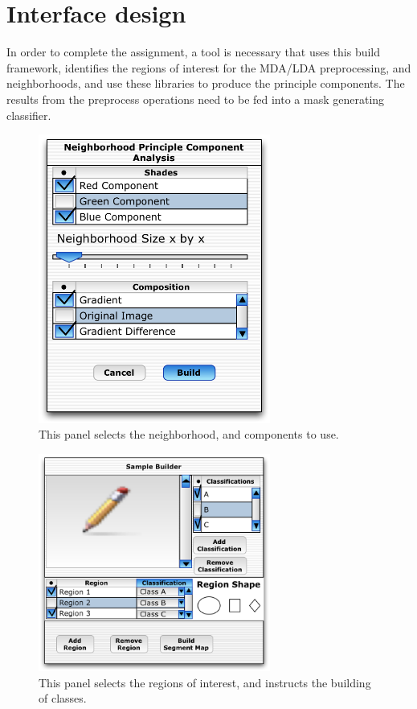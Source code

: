 \documentclass[11pt, twocolumn]{article}
\begin{document}
\section{Interface design}
In order to complete the assignment, a tool is necessary that uses this build framework, identifies the regions of interest for the MDA/LDA preprocessing,  and neighborhoods, and use these libraries to produce the principle components.    The results from the preprocess operations need to be fed into a mask generating classifier.  

\begin{figure}[htbp] %
   \centering
   \includegraphics[width=3in]{neighborhoodPCA.png} 
   \caption{This panel selects the neighborhood, and components to use.}
   \label{neighborhoodPCA}
\end{figure}


\begin{figure}[htbp] %
   \centering
   \includegraphics[width=3in]{regionOfInterestPanel.png} 
   \caption{This panel selects the regions of interest, and instructs the building of classes.}
   \label{regionOfInterestPanel}
\end{figure}
\end{document}
